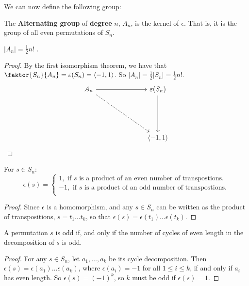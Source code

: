 We can now define the following group:

\begin{definition}
  The \textbf{Alternating group} of \textbf{degree} $n$,  $A_n$, is the kernel
  of  $\epsilon$. That is, it is the group of all even permutations of $S_n$.
\end{definition}

\begin{lemma}\label{lemma_3.6.4}
  $|A_n|=\frac{1}{2}n!$ .
\end{lemma}
\begin{proof}
  By the first isomorphism theorem, we have that
  $\faktor{S_n}{A_n}=\epsilon(S_n)=\langle -1 ,1 \rangle$. So
  $|A_n|=\frac{1}{2}|S_n|=\frac{1}{2}n!$.
  \[\begin{tikzcd}
    {A_n} &&& {\epsilon(S_n)} \\
    \\
    \\
          &&& {\langle -1, 1 \rangle}
          \arrow[from=1-1, to=1-4]
          \arrow[from=1-4, to=4-4]
          \arrow[dashed, from=1-1, to=4-4]
  \end{tikzcd}\]
\end{proof}
\begin{corollary}
  For $s \in S_n$:
  \begin{equation*}
    \epsilon(s)=\begin{cases}
      1, \text{ if } s \text{ is a product of an even number of
      transpostions.} \\
      -1, \text{ if } s \text{ is a product of an odd number of
      transpostions.} \\
    \end{cases}
  \end{equation*}
\end{corollary}
\begin{proof}
  Since $\epsilon$ is a homomorphism, and any $s \in S_n$ can be written as
  the product of transpositions, $s=t_1 \dots t_k$, so that
  $\epsilon(s)=\epsilon(t_1) \dots \epsilon(t_k)$.
\end{proof}

\begin{lemma}\label{lemma_3.6.5}
  A permutation $s$ is odd if, and only if the number of cycles of even length
  in the decomposition of $s$ is odd.
\end{lemma}
\begin{proof}
  For any $s \in S_n$, let  $a_1, \dots, a_k$ be its cycle decomposition. Then
  $\epsilon(s)=\epsilon(a_1) \dots \epsilon(a_k)$, where $\epsilon(a_i)=-1$
  for all $1 \leq i \leq k$, if and only if $a_i$ has even length. So
  $\epsilon(s)=(-1)^k$, so $k$ must be odd if  $\epsilon(s)=1$.
\end{proof}

